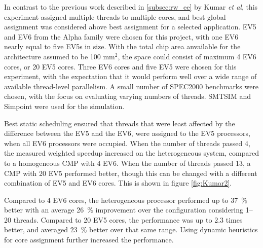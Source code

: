 In contrast to the previous work described in \ref{subsec:rw_ee} by Kumar \textit{et al}, this experiment assigned multiple threads to multiple cores, and best global assignment was considered above best assignment for a selected application.
EV5 and EV6 from the Alpha family were chosen for this project, with one EV6 nearly equal to five EV5s in size.
With the total chip area anvailable for the architecture assumed to be 100 mm$^2$, the space could consist of maximum 4 EV6 cores, or 20 EV5 cores.
Three EV6 cores and five EV5 were chosen for this experiment, with the expectation that it would perform well over a wide range of available thread-level parallelism. 
A small number of SPEC2000 benchmarks were chosen, with the focus on evaluating varying numbers of threads.
SMTSIM and Simpoint were used for the simulation.


Best static scheduling ensured that threads that were least affected by the difference between the EV5 and the EV6, were assigned to the EV5 processors, when all EV6 processors were occupied.
When the number of threads passed 4, the measured weighted speedup increased on the heterogeneous system, compared to a homogeneous CMP with 4 EV6.
When the number of threads passed 13, a CMP with 20 EV5 performed better, though this can be changed with a different combination of EV5 and EV6 cores.
This is shown in figure \ref{fig:Kumar2}.

Compared to 4 EV6 cores, the heterogeneous processor performed up to 37~\% better with an average 26~\% improvement over the configuration considering 1--20 threads. 
Compared to 20 EV5 cores, the performance was up to 2.3 times better, and averaged 23~\% better over that same range.
Using dynamic heuristics for core assignment further increased the performance. \cite{heterogeneous-perf}

